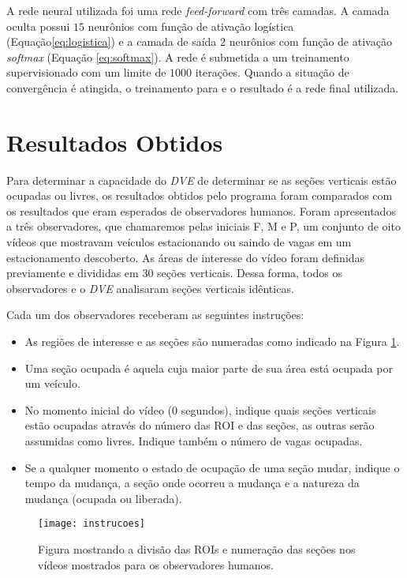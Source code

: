 A rede neural utilizada foi uma rede \textit{feed-forward} com três camadas. A camada oculta possui $15$ neurônios com função de ativação logística (Equação\ref{eq:logistica}) e a camada de saída $2$ neurônios com função de ativação \textit{softmax} (Equação \ref{eq:softmax}). A rede é submetida a um treinamento supervisionado com um limite de $1000$ iterações. Quando a situação de convergência é atingida, o treinamento para e o resultado é a rede final utilizada.


\section{Resultados Obtidos}

Para determinar a capacidade do \textit{DVE} de determinar se as seções verticais estão ocupadas ou livres, os resultados obtidos pelo programa foram comparados com os resultados que eram esperados de observadores humanos. Foram apresentados a três observadores, que chamaremos pelas iniciais F, M e P, um conjunto de oito vídeos que mostravam veículos estacionando ou saindo de vagas em um estacionamento descoberto. As áreas de interesse do vídeo foram definidas previamente e divididas em $30$ seções verticais. Dessa forma, todos os observadores e o \textit{DVE} analisaram seções verticais idênticas. 

Cada um dos observadores receberam as seguintes instruções:

\begin{itemize}
  \item As regiões de interesse e as seções são numeradas como indicado na Figura \ref{fig:instrucao}.
	\item Uma seção ocupada é aquela cuja maior parte de sua área está ocupada por um veículo.
	\item No momento inicial do vídeo ($0$ segundos), indique quais seções verticais estão ocupadas através do número das ROI e das seções, as outras serão assumidas como livres. Indique também o número de vagas ocupadas.
	\item Se a qualquer momento o estado de ocupação de uma seção mudar, indique o tempo da mudança, a seção onde ocorreu a mudança e a natureza da mudança (ocupada ou liberada).
\end{itemize}

\begin{figure}
\centering
\texttt{[image: instrucoes]}
\centering
\caption{Figura mostrando a divisão das ROIs e numeração das seções nos vídeos mostrados para os observadores humanos.}
\label{fig:instrucao}
\end{figure}

